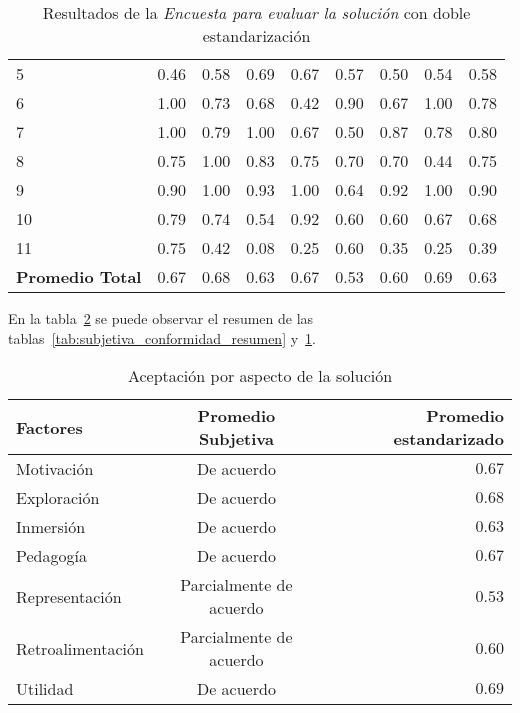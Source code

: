 \begin{table}[H]
\begin{tabular}{lrrrrrrrr}
5              & 0.46 & 0.58 & 0.69 & 0.67 & 0.57 & 0.50 & 0.54 & 0.58 \\
6              & 1.00 & 0.73 & 0.68 & 0.42 & 0.90 & 0.67 & 1.00 & 0.78 \\
7              & 1.00 & 0.79 & 1.00 & 0.67 & 0.50 & 0.87 & 0.78 & 0.80 \\
8              & 0.75 & 1.00 & 0.83 & 0.75 & 0.70 & 0.70 & 0.44 & 0.75 \\
9              & 0.90 & 1.00 & 0.93 & 1.00 & 0.64 & 0.92 & 1.00 & 0.90 \\
10             & 0.79 & 0.74 & 0.54 & 0.92 & 0.60 & 0.60 & 0.67 & 0.68 \\
11             & 0.75 & 0.42 & 0.08 & 0.25 & 0.60 & 0.35 & 0.25 & 0.39 \\
\midrule
\textbf{Promedio Total} & 0.67 & 0.68 & 0.63 & 0.67 & 0.53 & 0.60 & 0.69 & 0.63 \\
\bottomrule
\end{tabular}
\caption{Resultados de la \emph{Encuesta para evaluar la solución} con doble estandarización}
\label{tab:subjetiva_conformidad_corregida}
\end{table}


En la tabla~\ref{tab:resultado_resumen_aspectos_aceptacion} se puede observar el 
resumen de las tablas~\ref{tab:subjetiva_conformidad_resumen} y~\ref{tab:subjetiva_conformidad_corregida}.


\begin{table}[H]
\centering
\begin{tabular}{lcr}
\toprule
Factores        & Promedio Subjetiva      & Promedio estandarizado \\
\midrule
Motivación        & De acuerdo              & $0.67$  \\
Exploración       & De acuerdo              & $0.68$  \\
Inmersión         & De acuerdo              & $0.63$  \\
Pedagogía         & De acuerdo              & $0.67$  \\
Representación    & Parcialmente de acuerdo & $0.53$  \\
Retroalimentación & Parcialmente de acuerdo & $0.60$  \\
Utilidad          & De acuerdo              & $0.69$  \\
\bottomrule
\end{tabular}
\caption{Aceptación por aspecto de la solución}
\label{tab:resultado_resumen_aspectos_aceptacion}
\end{table}

